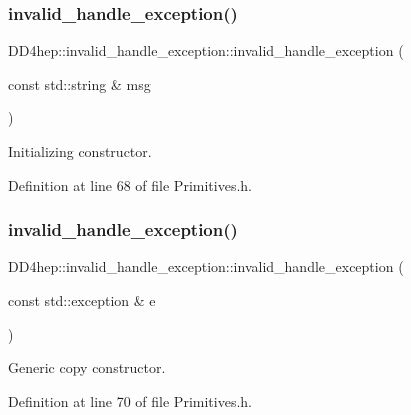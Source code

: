 \subsubsection{\texorpdfstring{invalid\+\_\+handle\+\_\+exception()}{invalid\_handle\_exception()}\hspace{0.1cm}{\footnotesize\ttfamily [2/4]}}
{\footnotesize\ttfamily D\+D4hep\+::invalid\+\_\+handle\+\_\+exception\+::invalid\+\_\+handle\+\_\+exception (\begin{DoxyParamCaption}\item[{const std\+::string \&}]{msg }\end{DoxyParamCaption})\hspace{0.3cm}{\ttfamily [inline]}}



Initializing constructor. 



Definition at line 68 of file Primitives.\+h.

\hypertarget{class_d_d4hep_1_1invalid__handle__exception_a9f983790d122d9b8b81c1147a99a3e01}{}\label{class_d_d4hep_1_1invalid__handle__exception_a9f983790d122d9b8b81c1147a99a3e01} 
\subsubsection{\texorpdfstring{invalid\+\_\+handle\+\_\+exception()}{invalid\_handle\_exception()}\hspace{0.1cm}{\footnotesize\ttfamily [3/4]}}
{\footnotesize\ttfamily D\+D4hep\+::invalid\+\_\+handle\+\_\+exception\+::invalid\+\_\+handle\+\_\+exception (\begin{DoxyParamCaption}\item[{const std\+::exception \&}]{e }\end{DoxyParamCaption})\hspace{0.3cm}{\ttfamily [inline]}}



Generic copy constructor. 



Definition at line 70 of file Primitives.\+h.

\hypertarget{class_d_d4hep_1_1invalid__handle__exception_a4216bbb641a3d4bb30d71f24a835da51}{}\label{class_d_d4hep_1_1invalid__handle__exception_a4216bbb641a3d4bb30d71f24a835da51} 
